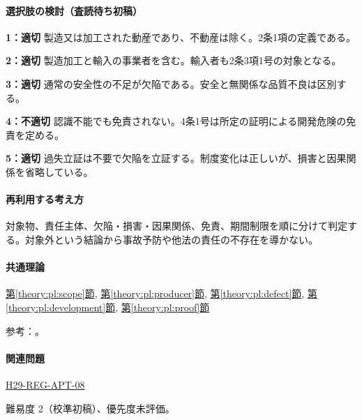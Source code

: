 \paragraph{選択肢の検討（査読待ち初稿）}\mbox{}\par

\noindent\textbf{1：適切} 製造又は加工された動産であり、不動産は除く。2条1項の定義である。\par

\noindent\textbf{2：適切} 製造加工と輸入の事業者を含む。輸入者も2条3項1号の対象となる。\par

\noindent\textbf{3：適切} 通常の安全性の不足が欠陥である。安全と無関係な品質不良は区別する。\par

\noindent\textbf{4：不適切} 認識不能でも免責されない。4条1号は所定の証明による開発危険の免責を定める。\par

\noindent\textbf{5：適切} 過失立証は不要で欠陥を立証する。制度変化は正しいが、損害と因果関係を省略している。\par

\paragraph{再利用する考え方} 対象物、責任主体、欠陥・損害・因果関係、免責、期間制限を順に分けて判定する。対象外という結論から事故予防や他法の責任の不存在を導かない。

\paragraph{共通理論} \hyperref[theory:pl:scope]{第\ref*{theory:pl:scope}節}, \hyperref[theory:pl:producer]{第\ref*{theory:pl:producer}節}, \hyperref[theory:pl:defect]{第\ref*{theory:pl:defect}節}, \hyperref[theory:pl:development]{第\ref*{theory:pl:development}節}, \hyperref[theory:pl:proof]{第\ref*{theory:pl:proof}節}

\par 参考：\cite{pl_statute,pl_qa,pl_definitions2018}。

\paragraph{関連問題} \hyperref[q:h29-reg-apt-08]{H29-REG-APT-08}

\par 難易度 2（校準初稿）、優先度未評価。

